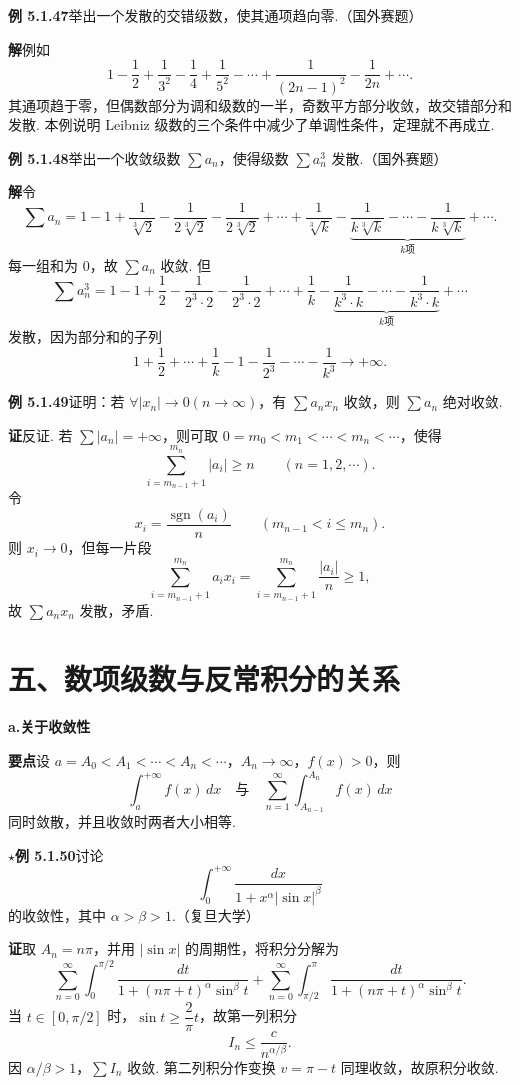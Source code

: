 \documentclass[UTF8,12pt,a4paper,fontset=fandol]{ctexart}
\begin{document}
\noindent\textbf{例 5.1.47}\quad 举出一个发散的交错级数，使其通项趋向零.（国外赛题）

\noindent\textbf{解}\quad 例如
\[
  1-\frac12+\frac1{3^2}-\frac14+\frac1{5^2}-\cdots
  +\frac1{(2n-1)^2}-\frac1{2n}+\cdots.
\]
其通项趋于零，但偶数部分为调和级数的一半，奇数平方部分收敛，故交错部分和发散. 本例说明 Leibniz 级数的三个条件中减少了单调性条件，定理就不再成立.

\noindent\textbf{例 5.1.48}\quad 举出一个收敛级数 $\displaystyle\sum a_n$，使得级数 $\displaystyle\sum a_n^3$ 发散.（国外赛题）

\noindent\textbf{解}\quad 令
\[
  \sum a_n=1-1+\frac1{\sqrt[3]2}-\frac1{2\sqrt[3]2}-\frac1{2\sqrt[3]2}
  +\cdots+\frac1{\sqrt[3]k}
  -\underbrace{\frac1{k\sqrt[3]k}-\cdots-\frac1{k\sqrt[3]k}}_{k\text{项}}+\cdots.
\]
每一组和为 $0$，故 $\sum a_n$ 收敛. 但
\[
  \sum a_n^3
  =1-1+\frac12-\frac1{2^3\cdot2}-\frac1{2^3\cdot2}
  +\cdots+\frac1k-\underbrace{\frac1{k^3\cdot k}-\cdots-\frac1{k^3\cdot k}}_{k\text{项}}+\cdots
\]
发散，因为部分和的子列
\[
  1+\frac12+\cdots+\frac1k-1-\frac1{2^3}-\cdots-\frac1{k^3}\to+\infty.
\]

\noindent\textbf{例 5.1.49}\quad 证明：若 $\forall |x_n|\to0(n\to\infty)$，有 $\displaystyle\sum a_nx_n$ 收敛，则 $\displaystyle\sum a_n$ 绝对收敛.

\noindent\textbf{证}\quad 反证. 若 $\displaystyle\sum |a_n|=+\infty$，则可取
$0=m_0<m_1<\cdots<m_n<\cdots$，使得
\[
  \sum_{i=m_{n-1}+1}^{m_n}|a_i|\ge n\qquad(n=1,2,\cdots).
\]
令
\[
  x_i=\frac{\operatorname{sgn}(a_i)}n
  \qquad(m_{n-1}<i\le m_n).
\]
则 $x_i\to0$，但每一片段
\[
  \sum_{i=m_{n-1}+1}^{m_n}a_ix_i
  =\sum_{i=m_{n-1}+1}^{m_n}\frac{|a_i|}{n}\ge1,
\]
故 $\sum a_nx_n$ 发散，矛盾.

\section*{五、数项级数与反常积分的关系}

\noindent\textbf{a.\quad 关于收敛性}

\noindent\textbf{要点}\quad 设 $a=A_0<A_1<\cdots<A_n<\cdots$，$A_n\to\infty$，$f(x)>0$，则
\[
  \int_a^{+\infty}f(x)\,dx
  \quad\text{与}\quad
  \sum_{n=1}^{\infty}\int_{A_{n-1}}^{A_n}f(x)\,dx
\]
同时敛散，并且收敛时两者大小相等.

\noindent\textbf{$\star$例 5.1.50}\quad 讨论
\[
  \int_0^{+\infty}\frac{dx}{1+x^\alpha|\sin x|^\beta}
\]
的收敛性，其中 $\alpha>\beta>1$.（复旦大学）

\noindent\textbf{证}\quad 取 $A_n=n\pi$，并用 $|\sin x|$ 的周期性，将积分分解为
\[
  \sum_{n=0}^{\infty}\int_0^{\pi/2}
  \frac{dt}{1+(n\pi+t)^\alpha\sin^\beta t}
  +\sum_{n=0}^{\infty}\int_{\pi/2}^{\pi}
  \frac{dt}{1+(n\pi+t)^\alpha\sin^\beta t}.
\]
当 $t\in[0,\pi/2]$ 时，$\sin t\ge\dfrac2\pi t$，故第一列积分
\[
  I_n\le\frac c{n^{\alpha/\beta}}.
\]
因 $\alpha/\beta>1$，$\sum I_n$ 收敛. 第二列积分作变换 $v=\pi-t$ 同理收敛，故原积分收敛.
\end{document}

